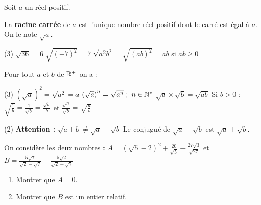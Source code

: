 \documentclass[10pt, a4paper]{article}
\begin{document}
\begin{Definition}
Soit $a$ un réel positif.

La \textbf{racine carrée} de $a$ est l'unique nombre réel positif dont le carré est égal à $a$. On le note $\sqrt{a}$.
\end{Definition}


\begin{Exemple}[][5 min]
\begin{tasks}[label=$\bullet$, label-width=5pt, item-indent=15pt](3)
\task $\sqrt{36} = 6$
\task $\sqrt{(-7)^2} = 7$
\task $\sqrt{a^2b^2} = \sqrt{(ab)^2} = ab$ \; si $ab \geq 0$
\end{tasks}
\end{Exemple}



\begin{Propriete}
Pour tout $a$ et $b$ de $\mathbb{R}^{+}$ on a :
\vspace{0.2cm}
\begin{tasks}[label=$\bullet$, label-width=5pt, item-indent=15pt](3)
\task $\left(\sqrt{a}\right)^{2}=\sqrt{a^{2}}=a$
\task $\left(\sqrt{a}\right)^{n}=\sqrt{a^{n}} \;;\; n\in\mathbb{N}^{*}$
\task $\sqrt{a}\times\sqrt{b}=\sqrt{ab}$
\task* Si $b>0$ : $\sqrt{\frac{1}{b}}=\frac{1}{\sqrt{b}}=\frac{\sqrt{b}}{b}$ \quad et \quad $\frac{\sqrt{a}}{\sqrt{b}}=\sqrt{\frac{a}{b}}$
\end{tasks}
\end{Propriete}


\begin{Remarque}
\begin{tasks}[label=$\bullet$, label-width=5pt, item-indent=15pt](2)
\task \textbf{Attention :} $\sqrt{a+b}\neq\sqrt{a}+\sqrt{b}$
\task Le conjugué de $\sqrt{a}-\sqrt{b}$ est $\sqrt{a}+\sqrt{b}$.
\end{tasks}
\end{Remarque}


\begin{Application}[][15 min]
On considère les deux nombres :
$A = (\sqrt{5} - 2)^2 + \frac{20}{\sqrt{5}} - \frac{27\sqrt{3}}{\sqrt{27}}$ \quad et \quad
$B = \frac{5\sqrt{7}}{\sqrt{2} - \sqrt{7}} + \frac{5\sqrt{2}}{\sqrt{2} + \sqrt{7}}$
\begin{enumerate}
    \item Montrer que $A=0$.
    \item Montrer que $B$ est un entier relatif.
\end{enumerate}





\end{Application}
\end{document}
